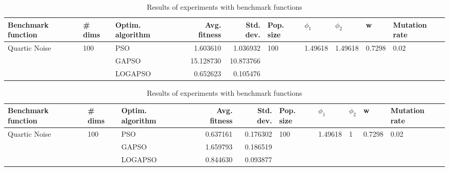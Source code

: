 \documentclass{article}
\begin{document}
\begin{table}
\centering
\caption{Results of experiments with benchmark functions}
\begin{tabular}{lllrrlllll}
\toprule
            Benchmark function &              \# dims & Optim. algorithm &  Avg. fitness &  Std. dev. &            Pop. size &               $\phi_{1}$ &               $\phi_{2}$ &                       w &         Mutation rate \\
\midrule
\multirow{3}{*}{Quartic Noise} & \multirow{3}{*}{100} &              PSO &      1.603610 &   1.036932 & \multirow{3}{*}{100} & \multirow{3}{*}{1.49618} & \multirow{3}{*}{1.49618} & \multirow{3}{*}{0.7298} & \multirow{3}{*}{0.02} \\
                               &                      &            GAPSO &     15.128730 &  10.873766 &                      &                          &                          &                         &                       \\
                               &                      &          LOGAPSO &      0.652623 &   0.105476 &                      &                          &                          &                         &                       \\
\bottomrule
\end{tabular}
\end{table}
\begin{table}
\centering
\caption{Results of experiments with benchmark functions}
\begin{tabular}{lllrrlllll}
\toprule
            Benchmark function &              \# dims & Optim. algorithm &  Avg. fitness &  Std. dev. &            Pop. size &               $\phi_{1}$ &         $\phi_{2}$ &                       w &         Mutation rate \\
\midrule
\multirow{3}{*}{Quartic Noise} & \multirow{3}{*}{100} &              PSO &      0.637161 &   0.176302 & \multirow{3}{*}{100} & \multirow{3}{*}{1.49618} & \multirow{3}{*}{1} & \multirow{3}{*}{0.7298} & \multirow{3}{*}{0.02} \\
                               &                      &            GAPSO &      1.659793 &   0.186519 &                      &                          &                    &                         &                       \\
                               &                      &          LOGAPSO &      0.844630 &   0.093877 &                      &                          &                    &                         &                       \\
\bottomrule
\end{tabular}
\end{table}
\end{document}
